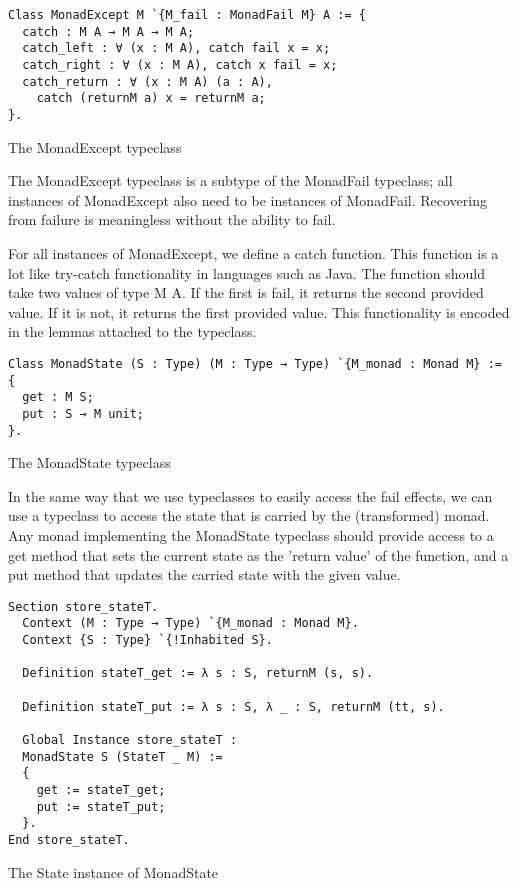 \begin{listing}
\begin{verbatim}
Class MonadExcept M `{M_fail : MonadFail M} A := {
  catch : M A → M A → M A;
  catch_left : ∀ (x : M A), catch fail x = x;
  catch_right : ∀ (x : M A), catch x fail = x;
  catch_return : ∀ (x : M A) (a : A),
    catch (returnM a) x = returnM a;
}.
\end{verbatim}
\caption{The MonadExcept typeclass}
\label{lst:monadexcept}
\end{listing}

The MonadExcept typeclass is a subtype of the MonadFail typeclass; all
instances of MonadExcept also need to be instances of MonadFail. Recovering
from failure is meaningless without the ability to fail.

For all instances of MonadExcept, we define a catch function. This function
is a lot like try-catch functionality in languages such as Java. The function
should take two values of type M A. If the first is fail, it returns the
second provided value. If it is not, it returns the first provided value. This
functionality is encoded in the lemmas attached to the typeclass.

\begin{listing}
\begin{verbatim}
Class MonadState (S : Type) (M : Type → Type) `{M_monad : Monad M} :=
{
  get : M S;
  put : S → M unit;
}.
\end{verbatim}
\caption{The MonadState typeclass}
\label{lst:monadstate}
\end{listing}

In the same way that we use typeclasses to easily access the fail effects, we 
can use a typeclass to access the state that is carried by the (transformed)
monad. Any monad implementing the MonadState typeclass should provide access to
a get method that sets the current state as the 'return value' of the function,
and a put method that updates the carried state with the given value.

\begin{listing}
\begin{verbatim}
Section store_stateT.
  Context (M : Type → Type) `{M_monad : Monad M}.
  Context {S : Type} `{!Inhabited S}.

  Definition stateT_get := λ s : S, returnM (s, s).

  Definition stateT_put := λ s : S, λ _ : S, returnM (tt, s).

  Global Instance store_stateT : 
  MonadState S (StateT _ M) :=
  {
    get := stateT_get;
    put := stateT_put;
  }.
End store_stateT.
\end{verbatim}
\caption{The State instance of MonadState}
\label{lst:monadstate_state}
\end{listing}

